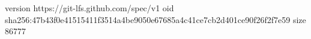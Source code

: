 version https://git-lfs.github.com/spec/v1
oid sha256:47b43f0e41515411f3514a4be9050e67685a4c41ce7cb2d401ce90f26f2f7e59
size 86777
